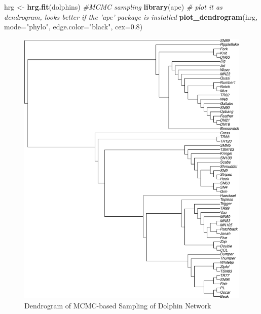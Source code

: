 \documentclass[]{article}
\newenvironment{Shaded}{\begin{snugshade}}{\end{snugshade}}
\newcommand{\KeywordTok}[1]{\textcolor[rgb]{0.13,0.29,0.53}{\textbf{{#1}}}}
\newcommand{\DataTypeTok}[1]{\textcolor[rgb]{0.13,0.29,0.53}{{#1}}}
\newcommand{\FloatTok}[1]{\textcolor[rgb]{0.00,0.00,0.81}{{#1}}}
\newcommand{\StringTok}[1]{\textcolor[rgb]{0.31,0.60,0.02}{{#1}}}
\newcommand{\CommentTok}[1]{\textcolor[rgb]{0.56,0.35,0.01}{\textit{{#1}}}}
\newcommand{\NormalTok}[1]{{#1}}
\begin{document}
\begin{Shaded}
\begin{Highlighting}[]
\NormalTok{hrg <-}\StringTok{ }\KeywordTok{hrg.fit}\NormalTok{(dolphins) }\CommentTok{#MCMC sampling}
\KeywordTok{library}\NormalTok{(ape)}
\CommentTok{# plot it as dendrogram, looks better if the 'ape' package is installed}
\KeywordTok{plot_dendrogram}\NormalTok{(hrg, }\DataTypeTok{mode=}\StringTok{"phylo"}\NormalTok{, }\DataTypeTok{edge.color=}\StringTok{"black"}\NormalTok{, }\DataTypeTok{cex=}\FloatTok{0.8}\NormalTok{)}
\end{Highlighting}
\end{Shaded}

\begin{figure}

{\centering \includegraphics{sta546_hw3_files/figure-latex/unnamed-chunk-3-1} 

}

\caption{Dendrogram of MCMC-based Sampling of Dolphin Network}\label{fig:unnamed-chunk-3}
\end{figure}
\end{document}
